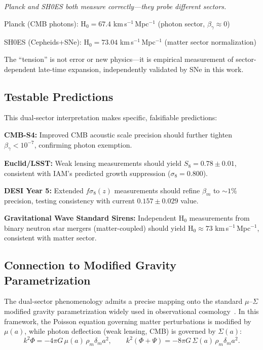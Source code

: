 \documentclass[twocolumn,superscriptaddress,prd,amsmath,amssymb]{revtex4-2}
\begin{document}
\textit{Planck and SH0ES both measure correctly—they probe different sectors.}

Planck (CMB photons): H$_0 = 67.4$ km\,s$^{-1}$\,Mpc$^{-1}$ (photon sector, $\beta_\gamma \approx 0$)

SH0ES (Cepheids+SNe): H$_0 = 73.04$ km\,s$^{-1}$\,Mpc$^{-1}$ (matter sector normalization)

The ``tension'' is not error or new physics—it is empirical measurement of sector-dependent late-time expansion, independently validated by SNe in this work.

\subsection{Testable Predictions}

This dual-sector interpretation makes specific, falsifiable predictions:

\textbf{CMB-S4:} Improved CMB acoustic scale precision should further tighten $\beta_\gamma < 10^{-7}$, confirming photon exemption.

\textbf{Euclid/LSST:} Weak lensing measurements should yield $S_8 = 0.78 \pm 0.01$, consistent with IAM's predicted growth suppression ($\sigma_8 = 0.800$).

\textbf{DESI Year 5:} Extended $f\sigma_8(z)$ measurements should refine $\beta_m$ to $\sim1\%$ precision, testing consistency with current $0.157 \pm 0.029$ value.

\textbf{Gravitational Wave Standard Sirens:} Independent H$_0$ measurements from binary neutron star mergers (matter-coupled) should yield H$_0 \approx 73$ km\,s$^{-1}$\,Mpc$^{-1}$, consistent with matter sector.

\subsection{Connection to Modified Gravity Parametrization}

The dual-sector phenomenology admits a precise mapping onto the standard $\mu$--$\Sigma$ modified gravity parametrization widely used in observational cosmology~\cite{Amendola2020}. In this framework, the Poisson equation governing matter perturbations is modified by $\mu(a)$, while photon deflection (weak lensing, CMB) is governed by $\Sigma(a)$:
\begin{equation}
k^2 \Phi = -4\pi G\, \mu(a)\, \rho_m \delta_m a^2, \qquad k^2(\Phi + \Psi) = -8\pi G\, \Sigma(a)\, \rho_m \delta_m a^2.
\end{equation}
\end{document}
